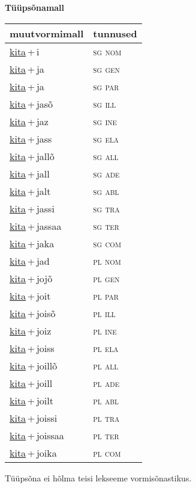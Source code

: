 
\vspace{1.8em}
\begin{minipage}{\textwidth}
\textbf{Tüüpsõnamall \,}\\

\begin{sideways}
\begin{tabular}{l l}
muutvormimall & tunnused \\
\hline
\underline{kita}\,+\,i & \textsc{ sg nom } \\
\underline{kita}\,+\,ja & \textsc{ sg gen } \\
\underline{kita}\,+\,ja & \textsc{ sg par } \\
\underline{kita}\,+\,jasõ & \textsc{ sg ill } \\
\underline{kita}\,+\,jaz & \textsc{ sg ine } \\
\underline{kita}\,+\,jass & \textsc{ sg ela } \\
\underline{kita}\,+\,jallõ & \textsc{ sg all } \\
\underline{kita}\,+\,jall & \textsc{ sg ade } \\
\underline{kita}\,+\,jalt & \textsc{ sg abl } \\
\underline{kita}\,+\,jassi & \textsc{ sg tra } \\
\underline{kita}\,+\,jassaa & \textsc{ sg ter } \\
\underline{kita}\,+\,jaka & \textsc{ sg com } \\
\underline{kita}\,+\,jad & \textsc{ pl nom } \\
\underline{kita}\,+\,jojõ & \textsc{ pl gen } \\
\underline{kita}\,+\,joit & \textsc{ pl par } \\
\underline{kita}\,+\,joisõ & \textsc{ pl ill } \\
\underline{kita}\,+\,joiz & \textsc{ pl ine } \\
\underline{kita}\,+\,joiss & \textsc{ pl ela } \\
\underline{kita}\,+\,joillõ & \textsc{ pl all } \\
\underline{kita}\,+\,joill & \textsc{ pl ade } \\
\underline{kita}\,+\,joilt & \textsc{ pl abl } \\
\underline{kita}\,+\,joissi & \textsc{ pl tra } \\
\underline{kita}\,+\,joissaa & \textsc{ pl ter } \\
\underline{kita}\,+\,joika & \textsc{ pl com } \\
\end{tabular}
\end{sideways}
\label{tab:tüüpsõnamall-kitai}

\end{minipage}

 
\vspace{1em}
\noindent Tüüpsõna ei hõlma teisi lekseeme vormi\-sõnastikus.
